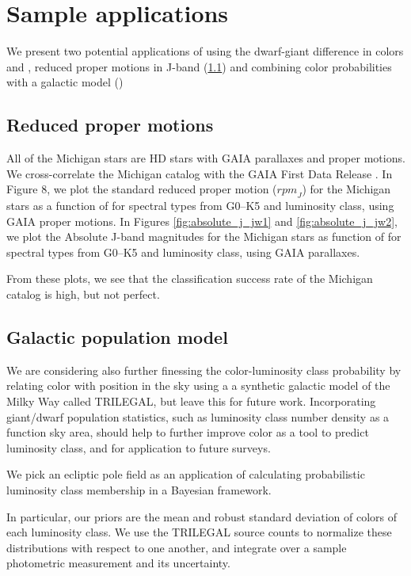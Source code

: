 \section{Sample applications}
We present two potential applications of using the dwarf-giant difference in colors \jwone and \jwtwo, reduced proper motions in J-band (\ref{subsec:RPM}) and combining color probabilities with a galactic model ()

\subsection{Reduced proper motions} \label{subsec:RPM}

All of the Michigan stars are HD stars with GAIA parallaxes and proper motions.  We cross-correlate the Michigan catalog with the GAIA First Data Release \citep[]{gaia1,gaia2,Lindegren2016}.  In Figure 8, we plot the standard reduced proper motion (${rpm}_J$) for the Michigan stars as a function of \jwtwo for spectral types from G0--K5 and luminosity class, using GAIA proper motions. In Figures \ref{fig:absolute_j_jw1} and \ref{fig:absolute_j_jw2}, we plot the Absolute J-band magnitudes for the Michigan stars as function of \jwtwo for spectral types from G0--K5 and luminosity class, using GAIA parallaxes.

From these plots, we see that the classification success rate of the Michigan catalog is high, but not perfect.

\subsection{Galactic population model} \label{subsec:galactic_model}

We are considering also further finessing the color-luminosity class probability by relating color with position in the sky using a a synthetic galactic model of the Milky Way called TRILEGAL, but leave this for future work. Incorporating giant/dwarf population statistics, such as luminosity class number density as a function sky area, should help to further improve color as a tool to predict luminosity class, and for application to future surveys.

We pick an ecliptic pole field as an application of calculating probabilistic luminosity class membership in a Bayesian framework.

In particular, our priors are the mean and robust standard deviation of colors of each luminosity class. We use the TRILEGAL source counts to normalize these distributions with respect to one another, and integrate over a sample photometric measurement and its uncertainty.

